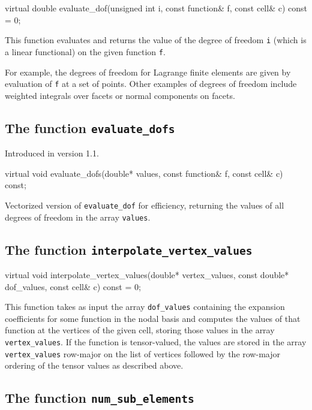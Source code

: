 \begin{code}
virtual double evaluate_dof(unsigned int i,
                            const function& f,
                            const cell& c) const = 0;
\end{code}

This function evaluates and returns the value of the degree of freedom
\texttt{i} (which is a linear functional) on the given function
\texttt{f}.
  
For example, the degrees of freedom for Lagrange finite elements are
given by evaluation of \texttt{f} at a set of points. Other examples
of degrees of freedom include weighted integrals over facets or normal
components on facets.

\subsection{The function \texttt{evaluate\_dofs}}
Introduced in version 1.1.

\begin{code}
virtual void evaluate_dofs(double* values,
                           const function& f,
                           const cell& c) const;
\end{code}

Vectorized version of \texttt{evaluate\_dof} for efficiency,
returning the values of all degrees of freedom in the array \texttt{values}.

\subsection{The function \texttt{interpolate\_vertex\_values}}

\begin{code}
virtual void
interpolate_vertex_values(double* vertex_values,
                          const double* dof_values,
                          const cell& c) const = 0;
\end{code}

This function takes as input the array \texttt{dof\_values} containing
the expansion coefficients for some function in the nodal basis and
computes the values of that function at the vertices of the given
cell, storing those values in the array \texttt{vertex\_values}. If
the function is tensor-valued, the values are stored in the array
\texttt{vertex\_values} row-major on the list of vertices followed by the
row-major ordering of the tensor values as described above.

\subsection{The function \texttt{num\_sub\_elements}}

